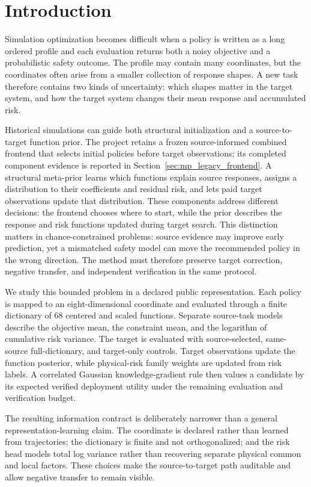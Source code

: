 \section{Introduction}\label{sec:meta_prior_introduction}

Simulation optimization becomes difficult when a policy is written as a long
ordered profile and each evaluation returns both a noisy objective and a
probabilistic safety outcome. The profile may contain many coordinates, but the
coordinates often arise from a smaller collection of response shapes. A new
task therefore contains two kinds of uncertainty: which shapes matter in the
target system, and how the target system changes their mean response and
accumulated risk.

Historical simulations can guide both structural initialization and a
source-to-target function prior. The project retains a frozen source-informed
combined frontend that selects initial policies before target observations; its completed
component evidence is reported in Section~\ref{sec:mp_legacy_frontend}.
A structural meta-prior learns
which functions explain source responses, assigns a distribution to their
coefficients and residual risk, and lets paid target observations update that
distribution. These components address different decisions: the frontend chooses
where to start, while the prior describes the response and risk functions
updated during target search. This distinction matters in chance-constrained problems:
source evidence may improve early prediction, yet a mismatched safety model
can move the recommended policy in the wrong direction. The method must
therefore preserve target correction, negative transfer, and independent
verification in the same protocol.

We study this bounded problem in a declared public representation. Each
policy is mapped to an eight-dimensional coordinate and evaluated through a
finite dictionary of 68 centered and scaled functions. Separate source-task
models describe the objective mean, the constraint mean, and the logarithm of
cumulative risk variance. The target is evaluated with source-selected, same-source
full-dictionary, and target-only controls. Target observations update the
function posterior, while physical-risk family weights are updated from risk
labels. A
correlated Gaussian knowledge-gradient rule then values a candidate by its
expected verified deployment utility under the remaining evaluation and
verification budget.

The resulting information contract is deliberately narrower than a general
representation-learning claim. The coordinate is declared rather than
learned from trajectories; the dictionary is finite and not orthogonalized;
and the risk head models total log variance rather than recovering separate
physical common and local factors. These choices make the source-to-target
path auditable and allow negative transfer to remain visible.

